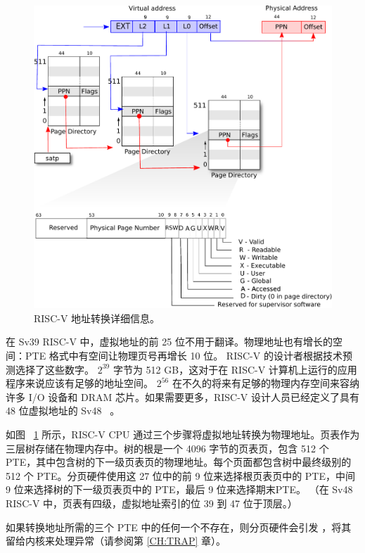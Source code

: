    \begin{figure}[t]
\center
\includegraphics[scale=0.5]{fig/riscv_pagetable.pdf}
\caption{RISC-V 地址转换详细信息。  }
\label{fig:riscv_pagetable}
\end{figure}     

在 Sv39 RISC-V 中，虚拟地址的前 25 位不用于翻译。物理地址也有增长的空间：PTE 格式中有空间让物理页号再增长 10 位。 RISC-V 的设计者根据技术预测选择了这些数字。    $2^{39}$    字节为 512 GB，这对于在 RISC-V 计算机上运行的应用程序来说应该有足够的地址空间。    $2^{56}$    在不久的将来有足够的物理内存空间来容纳许多 I/O 设备和 DRAM 芯片。如果需要更多，RISC-V 设计人员已经定义了具有 48 位虚拟地址的 Sv48~    \cite{riscv:priv}    。  

如图~    \ref{fig:riscv_pagetable}    所示，RISC-V CPU 通过三个步骤将虚拟地址转换为物理地址。页表作为三层树存储在物理内存中。树的根是一个 4096 字节的页表页，包含 512 个 PTE，其中包含树的下一级页表页的物理地址。每个页面都包含树中最终级别的 512 个 PTE。分页硬件使用这 27 位中的前 9 位来选择根页表页中的 PTE，中间 9 位来选择树的下一级页表页中的 PTE，最后 9 位来选择期末PTE。 （在 Sv48 RISC-V 中，页表有四级，虚拟地址索引的位 39 到 47 位于顶层。）  

如果转换地址所需的三个 PTE 中的任何一个不存在，则分页硬件会引发        ，将其留给内核来处理异常（请参阅第    \ref{CH:TRAP}    章）。  

